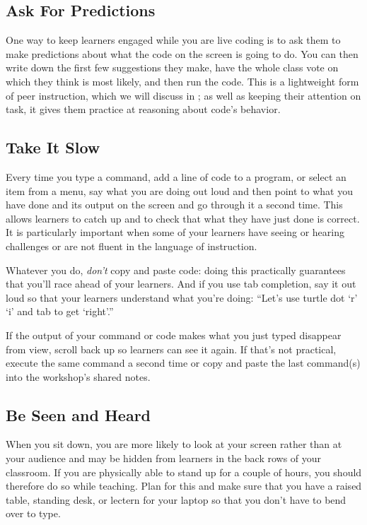 \subsection*{Ask For Predictions}

One way to keep learners engaged while you are live coding
is to ask them to make predictions about what the code on the screen is going to do.
You can then write down the first few suggestions they make,
have the whole class vote on which they think is most likely,
and then run the code.
This is a lightweight form of peer instruction,
which we will discuss in ;
as well as keeping their attention on task,
it gives them practice at reasoning about code's behavior.

\subsection*{Take It Slow}

Every time you type a command,
add a line of code to a program,
or select an item from a menu,
say what you are doing out loud
and then point to what you have done and its output on the screen
and go through it a second time.
This allows learners to catch up
and to check that what they have just done is correct.
It is particularly important when some of your learners have seeing or hearing challenges
or are not fluent in the language of instruction.

Whatever you do,
\emph{don't} copy and paste code:
doing this practically guarantees that you'll race ahead of your learners.
And if you use tab completion,
say it out loud so that your learners understand what you're doing:
``Let's use turtle dot `r' `i' and tab to get `right'.''

If the output of your command or code makes what you just typed disappear from view,
scroll back up so learners can see it again.
If that's not practical,
execute the same command a second time
or copy and paste the last command(s) into the workshop's shared notes.

\subsection*{Be Seen and Heard}

When you sit down,
you are more likely to look at your screen rather than at your audience
and may be hidden from learners in the back rows of your classroom.
If you are physically able to stand up for a couple of hours,
you should therefore do so while teaching.
Plan for this and make sure that you have a raised table,
standing desk,
or lectern
for your laptop
so that you don't have to bend over to type.


